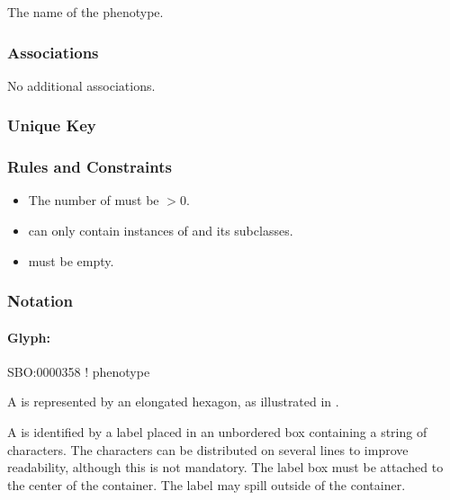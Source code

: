 \begin{attributes}
   The name of the phenotype.
\end{attributes}

\subsubsection{Associations}

No additional associations.

\subsubsection{Unique Key}

\begin{logicalkey}
\item {}
\item {}
\end{logicalkey}

\subsubsection{Rules and Constraints}

\begin{itemize}
\item The number of  must be $>0$.
\item {} can only contain instances of
 and its subclasses.
\item {} must be empty.
\end{itemize}

\subsubsection{Notation}

\paragraph{Glyph: }
\label{sec:techref:phenotype}

\begin{glyphDescription}

\glyphSboTerm SBO:0000358 ! phenotype

\glyphContainer A  is represented by an elongated
hexagon, as illustrated in .

\glyphLabel A  is identified by a label placed in an
unbordered box containing a string of characters.  The characters can be
distributed on several lines to improve readability, although this is not
mandatory.  The label box must be attached to the center of the
 container.  The label may spill outside of the container.
\end{glyphDescription}

